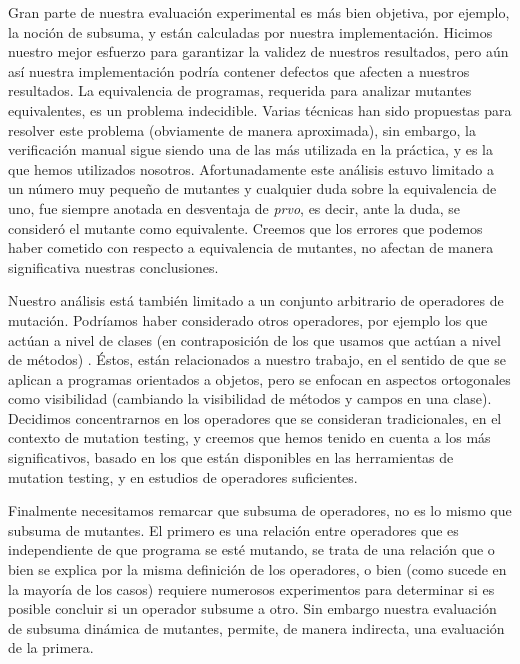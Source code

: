 Gran parte de nuestra evaluaci\'on experimental es m\'as bien objetiva, por ejemplo, la noci\'on de subsuma, y est\'an calculadas por nuestra implementaci\'on. Hicimos nuestro mejor esfuerzo para garantizar la validez de nuestros resultados, pero a\'un as\'i nuestra implementaci\'on podr\'ia contener defectos que afecten a nuestros resultados. La equivalencia de programas, requerida para analizar mutantes equivalentes, es un problema indecidible. Varias t\'ecnicas han sido propuestas para resolver este problema (obviamente de manera aproximada), sin embargo, la verificaci\'on manual sigue siendo una de las m\'as utilizada en la pr\'actica, y es la que hemos utilizados nosotros. Afortunadamente este an\'alisis estuvo limitado a un n\'umero muy peque\~no de mutantes y cualquier duda sobre la equivalencia de uno, fue siempre anotada en desventaja de \emph{prvo}, es decir, ante la duda, se consider\'o el mutante como equivalente. Creemos que los errores que podemos haber cometido con respecto a equivalencia de mutantes, no afectan de manera significativa nuestras conclusiones.

Nuestro an\'alisis est\'a tambi\'en limitado a un conjunto arbitrario de operadores de mutaci\'on. Podr\'iamos haber considerado otros operadores, por ejemplo los que act\'uan a nivel de clases (en contraposici\'on de los que usamos que act\'uan a nivel de m\'etodos) \cite{bibliography.mutation.class-level-ops}. \'Estos, est\'an relacionados a nuestro trabajo, en el sentido de que se aplican a programas orientados a objetos, pero se enfocan en aspectos ortogonales como visibilidad (cambiando la visibilidad de m\'etodos y campos en una clase). Decidimos concentrarnos en los operadores que se consideran tradicionales, en el contexto de mutation testing, y creemos que hemos tenido en cuenta a los m\'as significativos, basado en los que est\'an disponibles en las herramientas de mutation testing, y en estudios de operadores suficientes.

Finalmente necesitamos remarcar que subsuma de operadores, no es lo mismo que subsuma de mutantes. El primero es una relaci\'on entre operadores que es independiente de que programa se est\'e mutando, se trata de una relaci\'on que o bien se explica por la misma definici\'on de los operadores, o bien (como sucede en la mayor\'ia de los casos) requiere numerosos experimentos para determinar si es posible concluir si un operador subsume a otro. Sin embargo nuestra evaluaci\'on de subsuma din\'amica de mutantes, permite, de manera indirecta, una evaluaci\'on de la primera.

